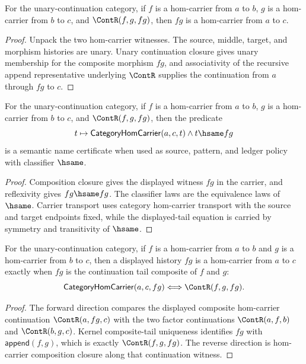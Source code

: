 \begin{theorem}
\label{thm:category-hom-carrier-comp-closed}
For the unary-continuation category, if \(f\) is a hom-carrier from \(a\) to \(b\), \(g\) is a hom-carrier from \(b\) to \(c\), and \(\ContR(f,g,fg)\), then \(fg\) is a hom-carrier from \(a\) to \(c\).
\end{theorem}
\begin{proof}
Unpack the two hom-carrier witnesses. The source, middle, target, and morphism histories are unary. Unary continuation closure gives unary membership for the composite morphism \(fg\), and associativity of the recursive append representative underlying \(\ContR\) supplies the continuation from \(a\) through \(fg\) to \(c\).
\end{proof}

\begin{theorem}
\label{thm:category-hom-carrier-comp-tail-semantic-name-cert}
For the unary-continuation category, if \(f\) is a hom-carrier from \(a\) to
\(b\), \(g\) is a hom-carrier from \(b\) to \(c\), and \(\ContR(f,g,fg)\),
then the predicate
$$
t\mapsto \mathsf{CategoryHomCarrier}(a,c,t)\land t\hsame fg
$$
is a semantic name certificate when used as source, pattern, and ledger policy
with classifier \(\hsame\).
\end{theorem}
\begin{proof}
Composition closure gives the displayed witness \(fg\) in the carrier, and
reflexivity gives \(fg\hsame fg\). The classifier laws are the equivalence
laws of \(\hsame\). Carrier transport uses category hom-carrier transport with
the source and target endpoints fixed, while the displayed-tail equation is
carried by symmetry and transitivity of \(\hsame\).
\end{proof}

\begin{theorem}
\label{thm:category-hom-carrier-comp-tail-exact-iff}
For the unary-continuation category, if \(f\) is a hom-carrier from \(a\) to
\(b\) and \(g\) is a hom-carrier from \(b\) to \(c\), then a displayed history
\(fg\) is a hom-carrier from \(a\) to \(c\) exactly when \(fg\) is the
continuation tail composite of \(f\) and \(g\):
$$
\mathsf{CategoryHomCarrier}(a,c,fg)
\Longleftrightarrow
\ContR(f,g,fg).
$$
\end{theorem}
\begin{proof}
The forward direction compares the displayed composite hom-carrier continuation
\(\ContR(a,fg,c)\) with the two factor continuations
\(\ContR(a,f,b)\) and \(\ContR(b,g,c)\). Kernel composite-tail uniqueness
identifies \(fg\) with \(\mathsf{append}(f,g)\), which is exactly
\(\ContR(f,g,fg)\). The reverse direction is hom-carrier composition closure
along that continuation witness.
\end{proof}


